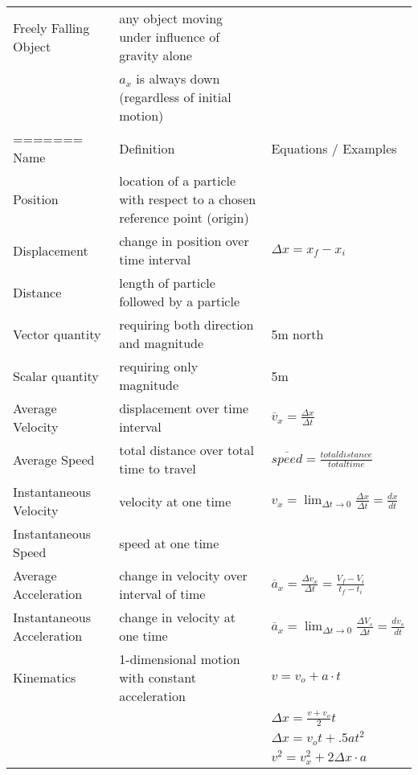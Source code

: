 \documentclass[11pt]{article}
\begin{document}
\begin{tabularx}{\textwidth}{l| X l}
    Freely Falling Object & any object moving under influence of gravity alone \\* & $ a_{x} $ is always down (regardless of initial motion) \\ \hline
=======
    Name             & Definition                                                               & Equations / Examples \\ \hline
    Position         & location of a particle with respect to a chosen reference point (origin) & \\ \hline
    Displacement     & change in position over time interval                                    & $ \Delta x=x_{f} - x_{i} $ \bigstrut \\ \hline
    Distance         & length of particle followed by a particle                                & \\ \hline
    Vector quantity  & requiring both direction and magnitude                                   & 5m north \\ \hline
    Scalar quantity  & requiring only magnitude                                                 & 5m \\ \hline
    Average Velocity & displacement over time interval                                          & $ \overline{v}_{x} = \frac{ \Delta x}{ \Delta t } $ \bigstrut \\ \hline
    Average Speed    & total distance over total time to travel                                 & $ \overline{speed} = \frac{ total distance }{ total time } $ \bigstrut \\ \hline
    Instantaneous Velocity     & velocity at one time                                   & $ v_{x} = \lim_{ \Delta t \to 0} \frac{\Delta x}{\Delta t} = \frac{dx}{dt} $ \bigstrut \\ \hline
    Instantaneous Speed        & speed at one time                                      & \\ \hline
    Average Acceleration       & change in velocity over interval of time               & $ \overline{a}_{x} = \frac{\Delta v_{x}}{\Delta t} = \frac{V_{f}-V_{i}}{t_{f}-t_{i}} $ \bigstrut \\ \hline
    Instantaneous Acceleration & change in velocity at one time                         & $ \overline{a}_{x} = \lim_{\Delta t \to 0} \frac{\Delta V_{s}}{\Delta t} = \frac{dv_{s}}{dt} $ \bigstrut \\ \hline
    Kinematics                 & 1-dimensional motion with constant acceleration        & $  v= v_{o} + a \cdot t $  \\*                                                                                     &  & $  \Delta x = \frac{v + v_{o}}{2}t $ \\* &  & $ \Delta x = v_{o}t + .5at^{2} $ \\* &  & $ v^{2} = v^{2}_{x}+ 2\Delta x \cdot a$ \bigstrut \\ \hline

\end{tabularx}
\end{document}

